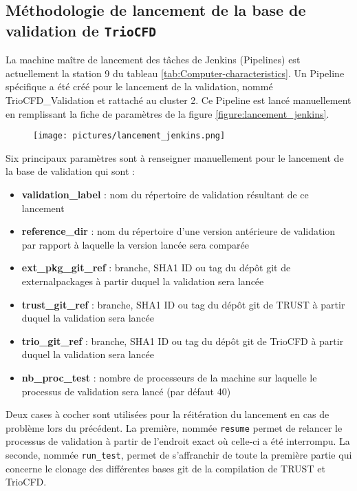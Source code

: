 \subsection{Méthodologie de lancement de la base de validation de \texttt{TrioCFD}}

La machine maître de lancement des tâches de Jenkins (Pipelines) est actuellement la station 9 du tableau \ref{tab:Computer-characteristics}.
Un Pipeline spécifique a été créé pour le lancement de la validation, nommé TrioCFD\_Validation et rattaché au cluster 2.
Ce Pipeline est lancé manuellement en remplissant la fiche de paramètres de la figure \ref{figure:lancement_jenkins}.

\begin{figure}[H]
   \centering
   \texttt{[image: pictures/lancement\_jenkins.png]}
   \vspace*{0.2cm}
\end{figure}
Six principaux paramètres sont à renseigner manuellement pour le lancement de la base de validation qui sont :
\begin{itemize}[label=$\Rightarrow$, font=\LARGE]
   \item \textbf{validation\_label} : nom du répertoire de validation résultant de ce lancement
   \item \textbf{reference\_dir} : nom du répertoire d'une version antérieure de validation par rapport à laquelle la version lancée sera comparée
   \item \textbf{ext\_pkg\_git\_ref} : branche, SHA1 ID ou tag du dépôt git de externalpackages à partir duquel la validation sera lancée
   \item \textbf{trust\_git\_ref} : branche, SHA1 ID ou tag du dépôt git de TRUST à partir duquel la validation sera lancée
   \item \textbf{trio\_git\_ref} : branche, SHA1 ID ou tag du dépôt git de TrioCFD à partir duquel la validation sera lancée
   \item \textbf{nb\_proc\_test} : nombre de processeurs de la machine sur laquelle le processus de validation sera lancé (par défaut 40)
\end{itemize}
Deux cases à cocher sont utilisées pour la réitération du lancement en cas de problème lors du précédent.
La première, nommée \texttt{resume} permet de relancer le processus de validation à partir de l'endroit exact où celle-ci a été interrompu.
La seconde, nommée \texttt{run\_test}, permet de s'affranchir de toute la première partie qui concerne le clonage des différentes bases git de la compilation de TRUST et TrioCFD.

